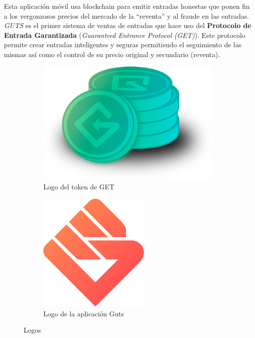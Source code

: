 Esta aplicación móvil usa blockchain para emitir entradas honestas que ponen fin a los vergonzosos precios del mercado de la ``reventa'' y al fraude en las entradas. \emph{GUTS} es el primer sistema de ventas de entradas que hace uso del \textbf{Protocolo de Entrada Garantizada} {\small (\textit{Guaranteed Entrance Protocol (GET)})}\cite{GET}. Este protocolo permite crear entradas inteligentes y seguras permitiendo el seguimiento de las mismas así como el control de su precio original y secundario (reventa). 

\begin{figure}[hbt]
	\centering
	\begin{subfigure}[b]{0.4\linewidth}
		\centering
		\includegraphics[width=0.8\linewidth]{figs/EstadoArte/Apps/getTOKEN.png}
		\caption{Logo del token de GET}\label{fig:getTOKEN}
	\end{subfigure} 
	\begin{subfigure}[b]{0.4\linewidth}
		\centering
		\includegraphics[width=0.8\linewidth]{figs/EstadoArte/Apps/gutsLOGO.png}
		\caption{Logo de la aplicación Guts}\label{fig:gutsLOGO}
	\end{subfigure} 
	\caption[Logos de Guts y GET]{Logos}
	\label{fig:Logos}
\end{figure}

